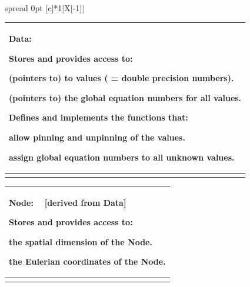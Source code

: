 \begin{center} \tabulinesep=1mm
\begin{longtabu} spread 0pt [c]{*{1}{|X[-1]}|}
\hline
\begin{center} \begin{tabularx}{\linewidth}{|*{1}{>{\raggedright\arraybackslash}X|}}\hline
\begin{center} {\bfseries Data\+:} \end{center} 
\begin{DoxyItemize}
\item Stores and provides access to\+:
\begin{DoxyItemize}
\item (pointers to) to values ( = double precision numbers).
\item (pointers to) the global equation numbers for all values.
\end{DoxyItemize}
\item Defines and implements the functions that\+:
\begin{DoxyItemize}
\item allow pinning and unpinning of the values.
\item assign global equation numbers to all unknown values.   
\end{DoxyItemize}
\end{DoxyItemize}\\\cline{1-1}
\end{tabularx}
\begin{tabularx}{\linewidth}{|*{1}{>{\raggedright\arraybackslash}X|}}\hline
\begin{center} {\bfseries Node\+:} ~\newline
\mbox{[}derived from {\bfseries Data}\mbox{]} \end{center} 
\begin{DoxyItemize}
\item Stores and provides access to\+:
\begin{DoxyItemize}
\item the spatial dimension of the Node.
\item the Eulerian coordinates of the Node.   
\end{DoxyItemize}
\end{DoxyItemize}\\\cline{1-1}
\end{tabularx}
\end{center} \\
\end{longtabu}
\end{center} 

